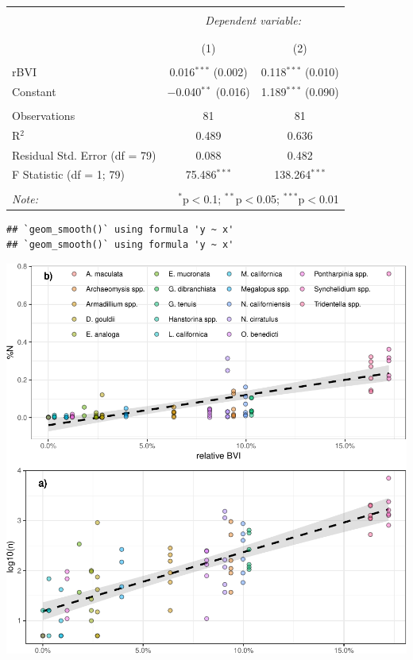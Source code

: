 \documentclass[
]{article}
\begin{document}
\begin{table}[!htbp] \centering 
  \caption{} 
  \label{} 
\begin{tabular}{@{\extracolsep{5pt}}lcc} 
\\[-1.8ex]\hline 
\hline \\[-1.8ex] 
 & \multicolumn{2}{c}{\textit{Dependent variable:}} \\ 
\cline{2-3} 
\\[-1.8ex] & %
\\[-1.8ex] & (1) & (2)\\ 
\hline \\[-1.8ex] 
 rBVI & 0.016$^{***}$ (0.002) & 0.118$^{***}$ (0.010) \\ 
  Constant & $-$0.040$^{**}$ (0.016) & 1.189$^{***}$ (0.090) \\ 
 \hline \\[-1.8ex] 
Observations & 81 & 81 \\ 
R$^{2}$ & 0.489 & 0.636 \\ 
Residual Std. Error (df = 79) & 0.088 & 0.482 \\ 
F Statistic (df = 1; 79) & 75.486$^{***}$ & 138.264$^{***}$ \\ 
\hline 
\hline \\[-1.8ex] 
\textit{Note:}  & \multicolumn{2}{r}{$^{*}$p$<$0.1; $^{**}$p$<$0.05; $^{***}$p$<$0.01} \\ 
\end{tabular} 
\end{table}

\clearpage

\begin{verbatim}
## `geom_smooth()` using formula 'y ~ x'
## `geom_smooth()` using formula 'y ~ x'
\end{verbatim}

\includegraphics{manuscript_files/figure-latex/unnamed-chunk-7-1.pdf}
\end{document}
